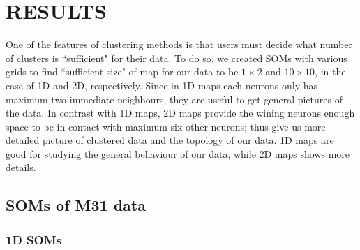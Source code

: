 \section{RESULTS}
    One of the features of clustering methods is that users must decide what number of clusters is ``sufficient" for their data.
    To do so, we created SOMs with various grids to find ``sufficient size" of map for our data to be $1\times2$ and $10\times10$, in the case of 1D and 2D, respectively. 
    Since in 1D maps each neurons only has maximum two immediate neighbours, they are useful to get general pictures of the data.
    In contrast with 1D maps, 2D maps provide the wining neurons enough space to be in contact with maximum six other neurons; thus give us more detailed picture of clustered data and the topology of our data.
    1D maps are good for studying the general behaviour of our data, while 2D maps shows more details.
    
    \subsection{SOMs of M31 data}
    \subsubsection{1D SOMs}
      
       